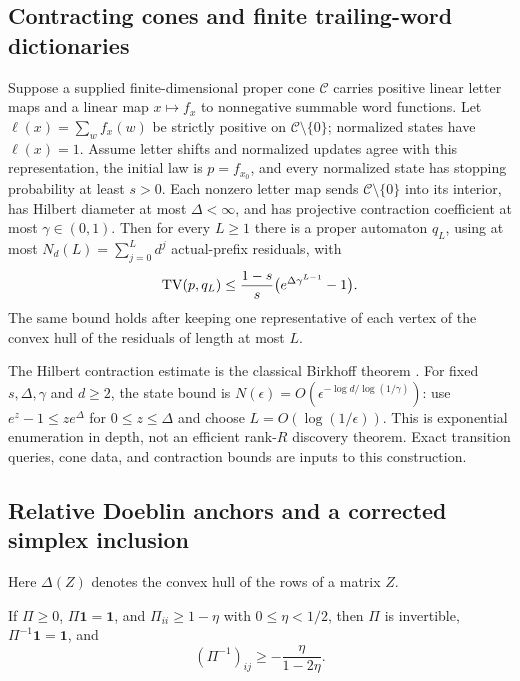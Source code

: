 \subsection{Contracting cones and finite trailing-word dictionaries}
\label{II:U:sec:trailing-word}
\begin{theorem}
\label{II:U:thm:trailing-word}
Suppose a supplied finite-dimensional proper cone $\mathcal C$ carries
positive linear letter maps and a linear map $x\mapsto f_x$ to
nonnegative summable word functions. Let $\ell(x)=\sum_w f_x(w)$ be
strictly positive on $\mathcal C\setminus\{0\}$; normalized states have
$\ell(x)=1$. Assume letter shifts and normalized updates agree with this
representation, the initial law is $p=f_{x_0}$, and every normalized
state has stopping probability at least $s>0$. Each nonzero letter map
sends $\mathcal C\setminus\{0\}$ into its interior, has Hilbert diameter
at most $\Delta<\infty$, and has projective contraction coefficient at
most $\gamma\in(0,1)$. Then for every $L\ge1$ there is a proper automaton
$q_L$, using at most $N_d(L)=\sum_{j=0}^Ld^j$ actual-prefix residuals, with
\begin{equation}
 \operatorname{TV}(p,q_L)\le\frac{1-s}{s}
       \bigl(e^{\Delta\gamma^{L-1}}-1\bigr).
 \label{II:U:eq:trailing-tv}
\end{equation}
The same bound holds after keeping one representative of each vertex of
the convex hull of the residuals of length at most $L$.
\end{theorem}

The Hilbert contraction estimate is the classical Birkhoff theorem
\citep{gaubert2015}. For fixed $s,\Delta,\gamma$ and $d\ge2$, the state bound is
$N(\epsilon)=O(\epsilon^{-\log d/\log(1/\gamma)})$:
use $e^z-1\le ze^\Delta$ for $0\le z\le\Delta$ and choose
$L=O(\log(1/\epsilon))$. This is exponential enumeration in depth,
not an efficient rank-$R$ discovery theorem. Exact transition queries,
cone data, and contraction bounds are inputs to this construction.

\subsection{Relative Doeblin anchors and a corrected simplex inclusion}
\label{II:U:sec:doeblin-sandwich}
Here $\Delta(Z)$ denotes the convex hull of the rows of a matrix $Z$.
\begin{lemma}
\label{II:U:lem:inverse-entry}
If $\Pi\ge0$, $\Pi\mathbf1=\mathbf1$, and $\Pi_{ii}\ge1-\eta$
with $0\le\eta<1/2$, then $\Pi$ is invertible,
$\Pi^{-1}\mathbf1=\mathbf1$, and
\[
 (\Pi^{-1})_{ij}\ge-\frac{\eta}{1-2\eta}.
\]
\end{lemma}


